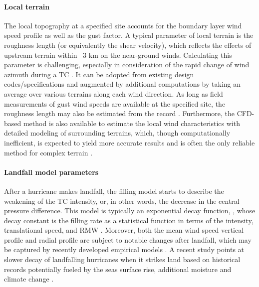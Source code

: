\paragraph{Local terrain} The local topography at a specified site accounts for the boundary layer wind speed profile as well as the gust factor. A typical parameter of local terrain is the roughness length (or equivalently the shear velocity), which reflects the effects of upstream terrain within ~3 km on the near-ground winds. Calculating this parameter is challenging, especially in consideration of the rapid change of wind azimuth during a TC \citep{vickery2009hurricane-a}. It can be adopted from existing design codes/specifications and augmented by additional computations by taking an average over various terrains along each wind direction. As long as field measurements of gust wind speeds are available at the specified site, the roughness length may also be estimated from the record \citep{masters2010objective}. Furthermore, the CFD-based method is also available to estimate the local wind characteristics with detailed modeling of surrounding terrains, which, though computationally inefficient, is expected to yield more accurate results and is often the only reliable method for complex terrain \citep{huang2013prediction,ishihara2005wind}. 

\paragraph{Landfall model parameters} After a hurricane makes landfall, the filling model starts to describe the weakening of the TC intensity, or, in other words, the decrease in the central pressure difference. This model is typically an exponential decay function, \citep{kaplan1995asimple,kaplan2001onthedecay}, whose decay constant is the filling rate as a statistical function in terms of the intensity, translational speed, and RMW \citep{vickery1995windfield, vickery2005simple, vickery2009hurricane-b}. Moreover, both the mean wind speed vertical profile and radial profile are subject to notable changes after landfall, which may be captured by recently developed empirical models \citep{fang2018reconstruction, snaiki2018semiempirical, zhao2013radial}. A recent study points at slower decay of landfalling hurricanes when it strikes land based on historical records potentially fueled by the seas surface rise, additional moisture and climate change \citep{li2020slower}. 

